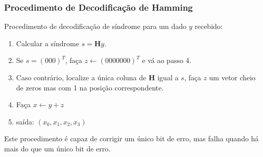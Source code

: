 \begin{frame}[allowframebreaks]
  \frametitle{Procedimento de Decodificação de Hamming}

  Procedimento de decodificação de síndrome para um dado $y$ recebido:
  \begin{enumerate}
  \item Calcular a síndrome $s = \mathbf{H} y$.
  \item Se $s = (000)^T$, faça $z \leftarrow (0000000)^T$ e vá ao passo 4.
  \item Caso contrário, localize a única coluna de $\mathbf{H}$ igual a $s$, faça $z$ um vetor cheio de zeros mas
	com 1 na posição correspondente.
  \item Faça $x \leftarrow y+z$
  \item saída: $(x_0, x_1, x_2, x_3)$ 
  \end{enumerate}

  Este procedimento é capaz de corrigir um único bit de erro, mas falha quando há mais do que um único bit de erro.
\end{frame}

